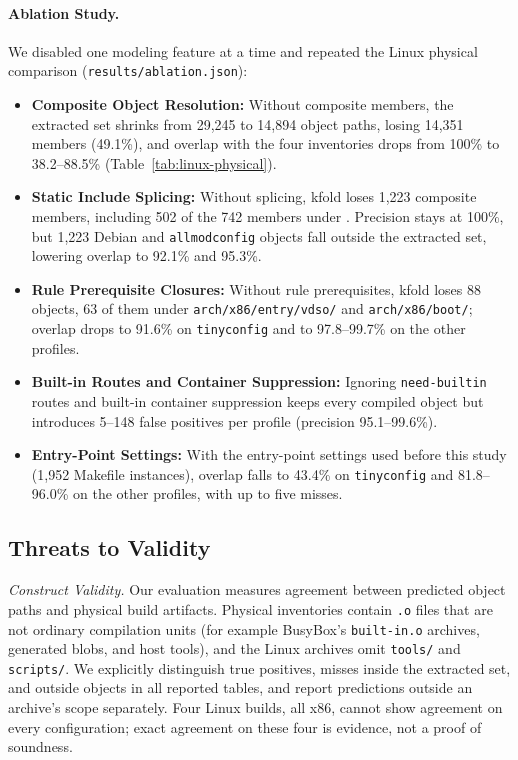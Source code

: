 \documentclass[acmsmall]{acmart}
\newcommand{\tool}{\textsf{kfold}\xspace}
\providecommand{\tightlist}{\setlength{\itemsep}{0pt}\setlength{\parskip}{0pt}}
\begin{document}
\paragraph{Ablation Study.}
We disabled one modeling feature at a time and repeated the Linux physical comparison (\texttt{results/ablation.json}):
\begin{itemize}
\tightlist
\item \textbf{Composite Object Resolution:} Without composite members, the extracted set shrinks from 29,245 to 14,894 object paths, losing 14,351 members (49.1\%), and overlap with the four inventories drops from 100\% to 38.2--88.5\% (Table~\ref{tab:linux-physical}).
\item \textbf{Static Include Splicing:} Without splicing, \tool loses 1,223 composite members, including 502 of the 742 members under . Precision stays at 100\%, but 1,223 Debian and \texttt{allmodconfig} objects fall outside the extracted set, lowering overlap to 92.1\% and 95.3\%.
\item \textbf{Rule Prerequisite Closures:} Without rule prerequisites, \tool loses 88 objects, 63 of them under \texttt{arch/x86/entry/vdso/} and \texttt{arch/x86/boot/}; overlap drops to 91.6\% on \texttt{tinyconfig} and to 97.8--99.7\% on the other profiles.
\item \textbf{Built-in Routes and Container Suppression:} Ignoring \texttt{need-builtin} routes and built-in container suppression keeps every compiled object but introduces 5--148 false positives per profile (precision 95.1--99.6\%).
\item \textbf{Entry-Point Settings:} With the entry-point settings used before this study (1,952 Makefile instances), overlap falls to 43.4\% on \texttt{tinyconfig} and 81.8--96.0\% on the other profiles, with up to five misses.
\end{itemize}

\subsection{Threats to Validity}\label{sec:eval:threats}

\emph{Construct Validity.}
Our evaluation measures agreement between predicted object paths and physical build artifacts.
Physical inventories contain \texttt{.o} files that are not ordinary compilation units (for example BusyBox's \texttt{built-in.o} archives, generated blobs, and host tools), and the Linux archives omit \texttt{tools/} and \texttt{scripts/}.
We explicitly distinguish true positives, misses inside the extracted set, and outside objects in all reported tables, and report predictions outside an archive's scope separately.
Four Linux builds, all x86, cannot show agreement on every configuration; exact agreement on these four is evidence, not a proof of soundness.
\end{document}
